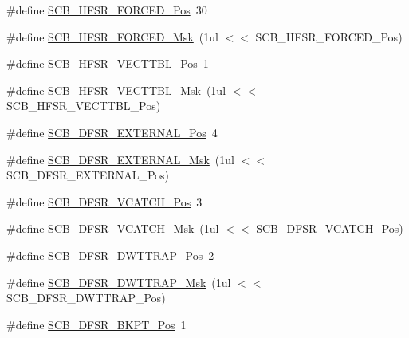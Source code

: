 \begin{DoxyCompactItemize}
\item 
\#define \mbox{\hyperlink{group___c_m_s_i_s___c_m3___s_c_b_gab361e54183a378474cb419ae2a55d6f4}{S\+C\+B\+\_\+\+H\+F\+S\+R\+\_\+\+F\+O\+R\+C\+E\+D\+\_\+\+Pos}}~30
\item 
\#define \mbox{\hyperlink{group___c_m_s_i_s___c_m3___s_c_b_ga6560d97ed043bc01152a7247bafa3157}{S\+C\+B\+\_\+\+H\+F\+S\+R\+\_\+\+F\+O\+R\+C\+E\+D\+\_\+\+Msk}}~(1ul $<$$<$ S\+C\+B\+\_\+\+H\+F\+S\+R\+\_\+\+F\+O\+R\+C\+E\+D\+\_\+\+Pos)
\item 
\#define \mbox{\hyperlink{group___c_m_s_i_s___c_m3___s_c_b_ga77993da8de35adea7bda6a4475f036ab}{S\+C\+B\+\_\+\+H\+F\+S\+R\+\_\+\+V\+E\+C\+T\+T\+B\+L\+\_\+\+Pos}}~1
\item 
\#define \mbox{\hyperlink{group___c_m_s_i_s___c_m3___s_c_b_gaac5e289211d0a63fe879a9691cb9e1a9}{S\+C\+B\+\_\+\+H\+F\+S\+R\+\_\+\+V\+E\+C\+T\+T\+B\+L\+\_\+\+Msk}}~(1ul $<$$<$ S\+C\+B\+\_\+\+H\+F\+S\+R\+\_\+\+V\+E\+C\+T\+T\+B\+L\+\_\+\+Pos)
\item 
\#define \mbox{\hyperlink{group___c_m_s_i_s___c_m3___s_c_b_ga13f502fb5ac673df9c287488c40b0c1d}{S\+C\+B\+\_\+\+D\+F\+S\+R\+\_\+\+E\+X\+T\+E\+R\+N\+A\+L\+\_\+\+Pos}}~4
\item 
\#define \mbox{\hyperlink{group___c_m_s_i_s___c_m3___s_c_b_ga3cba2ec1f588ce0b10b191d6b0d23399}{S\+C\+B\+\_\+\+D\+F\+S\+R\+\_\+\+E\+X\+T\+E\+R\+N\+A\+L\+\_\+\+Msk}}~(1ul $<$$<$ S\+C\+B\+\_\+\+D\+F\+S\+R\+\_\+\+E\+X\+T\+E\+R\+N\+A\+L\+\_\+\+Pos)
\item 
\#define \mbox{\hyperlink{group___c_m_s_i_s___c_m3___s_c_b_gad02d3eaf062ac184c18a7889c9b6de57}{S\+C\+B\+\_\+\+D\+F\+S\+R\+\_\+\+V\+C\+A\+T\+C\+H\+\_\+\+Pos}}~3
\item 
\#define \mbox{\hyperlink{group___c_m_s_i_s___c_m3___s_c_b_gacbb931575c07b324ec793775b7c44d05}{S\+C\+B\+\_\+\+D\+F\+S\+R\+\_\+\+V\+C\+A\+T\+C\+H\+\_\+\+Msk}}~(1ul $<$$<$ S\+C\+B\+\_\+\+D\+F\+S\+R\+\_\+\+V\+C\+A\+T\+C\+H\+\_\+\+Pos)
\item 
\#define \mbox{\hyperlink{group___c_m_s_i_s___c_m3___s_c_b_gaccf82364c6d0ed7206f1084277b7cc61}{S\+C\+B\+\_\+\+D\+F\+S\+R\+\_\+\+D\+W\+T\+T\+R\+A\+P\+\_\+\+Pos}}~2
\item 
\#define \mbox{\hyperlink{group___c_m_s_i_s___c_m3___s_c_b_ga3f7384b8a761704655fd45396a305663}{S\+C\+B\+\_\+\+D\+F\+S\+R\+\_\+\+D\+W\+T\+T\+R\+A\+P\+\_\+\+Msk}}~(1ul $<$$<$ S\+C\+B\+\_\+\+D\+F\+S\+R\+\_\+\+D\+W\+T\+T\+R\+A\+P\+\_\+\+Pos)
\item 
\#define \mbox{\hyperlink{group___c_m_s_i_s___c_m3___s_c_b_gaf28fdce48655f0dcefb383aebf26b050}{S\+C\+B\+\_\+\+D\+F\+S\+R\+\_\+\+B\+K\+P\+T\+\_\+\+Pos}}~1
$$
\end{DoxyCompactItemize}
